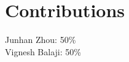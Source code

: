 \documentclass[12pt,conference]{IEEEtran}
\begin{document}
\section{Contributions}

Junhan Zhou: 50\%\\
Vignesh Balaji: 50\%




%
%



%
%
\end{document}
